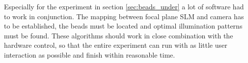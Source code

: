 Especially for the experiment in section \ref{sec:beads_under} a lot
of software had to work in conjunction. The mapping between focal
plane SLM and camera has to be established, the beads must be located
and optimal illumination patterns must be found. These algorithms
should work in close combination with the hardware control, so that
the entire experiment can run with as little user interaction as
possible and finish within reasonable time.



